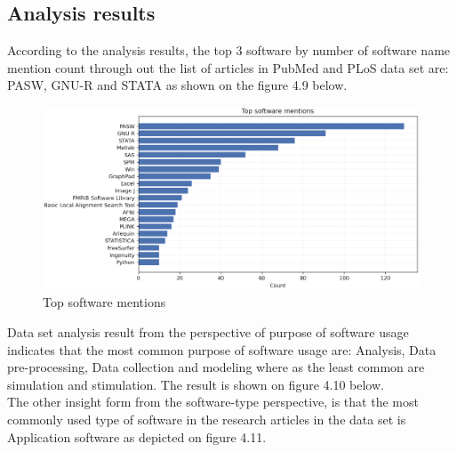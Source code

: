 \subsection{Analysis results }
\label{subsec:dataset:Analysis:results}

According to the analysis results, the top 3 software by number of software name mention count through out the list of articles in PubMed and PLoS data set are: PASW, GNU-R and STATA as shown on the figure 4.9 below. 

\begin{figure}[htbp]
	\centering
	\includegraphics[width=1\textwidth]{4.graphics/figures/ch_4/analysisresults/1.Top software mentions}
	\caption{Top software mentions}
	\label{fig:chapter03:setup}
\end{figure}

Data set analysis result from the perspective of purpose of software usage indicates that the most common purpose of software usage are: Analysis, Data pre-processing, Data collection and modeling where as the least common are simulation and stimulation. The result is shown on figure 4.10 below. \\

The other insight form from  the software-type perspective, is that the most commonly used type of software in the research articles in the data set is Application software as depicted on figure 4.11. \\

